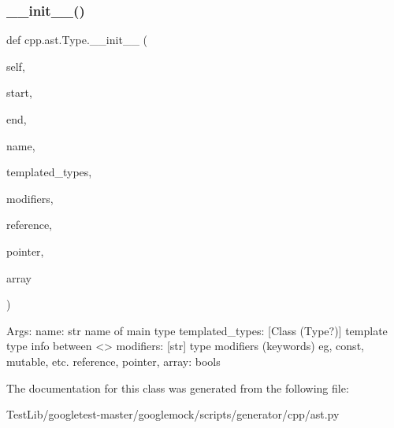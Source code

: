 \subsubsection{\texorpdfstring{\+\_\+\+\_\+init\+\_\+\+\_\+()}{\_\_init\_\_()}}
{\footnotesize\ttfamily def cpp.\+ast.\+Type.\+\_\+\+\_\+init\+\_\+\+\_\+ (\begin{DoxyParamCaption}\item[{}]{self,  }\item[{}]{start,  }\item[{}]{end,  }\item[{}]{name,  }\item[{}]{templated\+\_\+types,  }\item[{}]{modifiers,  }\item[{}]{reference,  }\item[{}]{pointer,  }\item[{}]{array }\end{DoxyParamCaption})}

\begin{DoxyVerb}Args:
  name: str name of main type
  templated_types: [Class (Type?)] template type info between <>
  modifiers: [str] type modifiers (keywords) eg, const, mutable, etc.
  reference, pointer, array: bools
\end{DoxyVerb}
 

The documentation for this class was generated from the following file\+:\begin{DoxyCompactItemize}
\item 
Test\+Lib/googletest-\/master/googlemock/scripts/generator/cpp/ast.\+py\end{DoxyCompactItemize}
